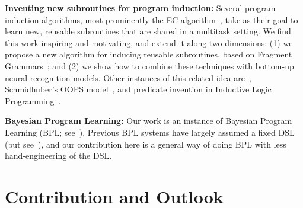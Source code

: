 \documentclass{article}
\begin{document}
 


 

 \noindent \textbf{Inventing new subroutines for program induction:}
 Several program induction algorithms, most prominently the EC algorithm~\cite{Dechter:2013:BLV:2540128.2540316}, take as their goal to learn new, reusable subroutines that are shared in a multitask setting. We find this work inspiring and motivating,
 and extend it along two dimensions: (1) we propose a new algorithm for
 inducing reusable subroutines, based on Fragment Grammars~\cite{tim};
 and (2) we show how to combine these techniques with bottom-up neural recognition models.
 Other instances of this related idea are~\cite{DBLP:conf/icml/LiangJK10}, Schmidhuber's OOPS model~\cite{schmidhuber2004optimal}, and predicate invention in Inductive Logic Programming~\cite{DBLP:conf/ecai/LinDETM14}.
 
\noindent\textbf{Bayesian Program
 Learning:} Our work is an instance of
 Bayesian Program
 Learning (BPL; see~\citep{lake2015human,Dechter:2013:BLV:2540128.2540316,ellis2016sampling,DBLP:conf/icml/LiangJK10}). Previous BPL systems have largely assumed a fixed DSL (but see~\cite{DBLP:conf/icml/LiangJK10}),
 and our contribution here is a general way of doing BPL with less hand-engineering of the DSL.
 
 \section{Contribution and Outlook}
\end{document}
